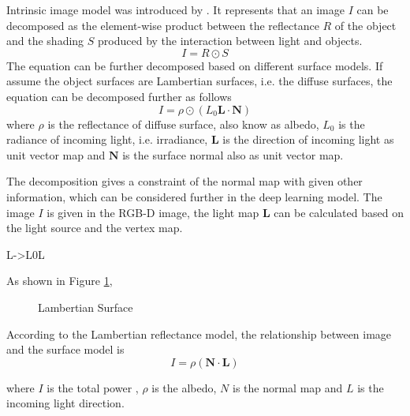 \documentclass[]{article}
\begin{document}
Intrinsic image model was introduced by \cite{intrinsic-image}. It represents that an image $ I $ can be decomposed as the element-wise product between the reflectance $ R $ of the object and the shading $ S $ produced by the interaction between light and objects.
\[ I =R  \odot S\]
The equation can be further decomposed based on different surface models. If assume the object surfaces are Lambertian surfaces, i.e. the diffuse surfaces, the equation can be decomposed further as follows
\[ I = \rho  \odot (L_0 \textbf{L} \cdot  \textbf{N}) \]
where $ \rho $ is the reflectance of diffuse surface, also know as albedo, $ L_0 $ is the radiance of  incoming light, i.e. irradiance, $ \textbf{L} $ is the direction of incoming light as unit vector map and $ \textbf{N} $ is the surface normal also as unit vector map.

The decomposition gives a constraint of the normal map with given other information, which can be considered further in the deep learning model. The image $ I $ is given in the RGB-D image, the light map $ \textbf{L} $ can be calculated based on the light source and the vertex map. 

L->L0L 



\newpage 
 As shown in Figure \ref{fig:lambertian-surface}, 
\begin{figure}[th]
	\centering
	\caption{Lambertian Surface}
	\label{fig:lambertian-surface}
\end{figure}
According to the Lambertian reflectance model, the relationship between image and the surface model is 
\[ I = \rho (\textbf{N} \cdot \textbf{L}) \]

where $ I $ is the total power , $ \rho $ is the albedo,  $ N $ is the normal map and $ L $ is the incoming light direction.
\end{document}
